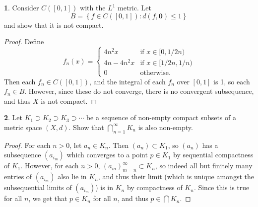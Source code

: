 \documentclass[12pt]{article}
\theoremstyle{definition}
\newtheorem{ex}{}
\begin{document}
\begin{ex}
	Consider $C([0, 1])$ with the $L^1$ metric.
	Let \begin{equation*}
		B = \left\lbrace f \in C([0, 1]) : d(f, \mathbf{0}) \leq 1 \right\rbrace
	\end{equation*}
	and show that it is not compact.
\end{ex}
\begin{proof}
	Define \begin{equation*}
		f_n(x) = \begin{cases}
			4n^2x     & \text{if } x \in [0, 1/2n)   \\
			4n - 4n^2x & \text{if } x \in [1/2n, 1/n) \\
			0       & \text{otherwise.}
		\end{cases}
	\end{equation*}
  Then each $f_n \in C([0,1])$, and the integral of each $f_n$ over $[0, 1]$ is 1, so each $f_n \in B$.
  However, since these do not converge, there is no convergent subsequence, and thus $X$ is not compact.
\end{proof}

\begin{ex}
	Let $K_1 \supset K_2 \supset K_3 \supset \cdots$ be a sequence of non-empty compact subsets of a metric space $(X, d)$.
	Show that $\bigcap_{n=1}^\infty K_n$ is also non-empty.
\end{ex}
\begin{proof}
  For each $n > 0$, let $a_n \in K_n$.
  Then $(a_n) \subset K_1$, so $(a_n)$ has a subsequence $(a_{i_m})$ which converges to a point $p \in K_1$ by sequential compactness of $K_1$.
  However, for each $n > 0$, $(a_m)_{m = n}^\infty \subset K_n$, so indeed all but finitely many entries of $(a_{i_m})$ also lie in $K_n$, and thus their limit (which is unique amongst the subsequential limits of $(a_{i_m})$) is in $K_n$ by compactness of $K_n$.
  Since this is true for all $n$, we get that $p \in K_n$ for all $n$, and thus $p \in \bigcap K_n$.
\end{proof}
\end{document}
